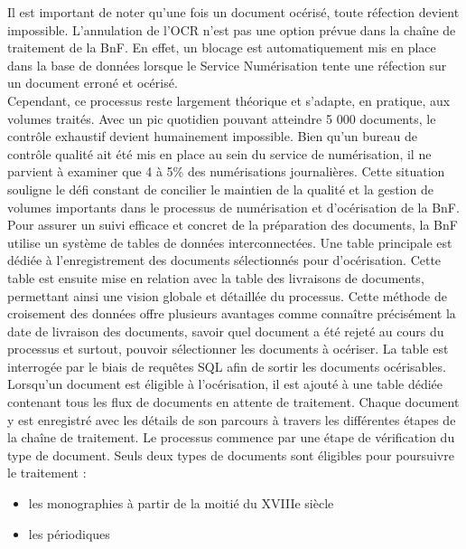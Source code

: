 \documentclass[a4paper,12pt,twoside]{book}
\begin{document}
	Il est important de noter qu'une fois un document océrisé, toute réfection devient impossible. L'annulation de l'OCR n'est pas une option prévue dans la chaîne de traitement de la BnF. En effet, un blocage est automatiquement mis en place dans la base de données lorsque le Service Numérisation tente une réfection sur un document erroné et océrisé.
	\\
	
	Cependant, ce processus reste largement théorique et s'adapte, en pratique, aux volumes traités. Avec un pic quotidien pouvant atteindre 5 000 documents, le contrôle exhaustif devient humainement impossible. Bien qu'un bureau de contrôle qualité ait été mis en place au sein du service de numérisation, il ne parvient à examiner que 4 à 5\% des numérisations journalières. Cette situation souligne le défi constant de concilier le maintien de la qualité et la gestion de volumes importants dans le processus de numérisation et d’océrisation de la BnF.
	\\
	
	Pour assurer un suivi efficace et concret de la préparation des documents, la BnF utilise un système de tables de données interconnectées. Une table principale est dédiée à l'enregistrement des documents sélectionnés pour d’océrisation. Cette table est ensuite mise en relation avec la table des livraisons de documents, permettant ainsi une vision globale et détaillée du processus. Cette méthode de croisement des données offre plusieurs avantages comme connaître précisément la date de livraison des documents, savoir quel document a été rejeté au cours du processus et surtout, pouvoir sélectionner les documents à océriser. La table est interrogée par le biais de requêtes SQL afin de sortir les documents océrisables.
	\\
	
	Lorsqu’un document est éligible à l'océrisation, il est ajouté à une table dédiée contenant tous les flux de documents en attente de traitement. Chaque document y est enregistré avec les détails de son parcours à travers les différentes étapes de la chaîne de traitement. Le processus commence par une étape de vérification du type de document. Seuls deux types de documents sont éligibles pour poursuivre le traitement : 
	\begin{itemize}
		\item les monographies à partir de la moitié du XVIIIe siècle
		\item les périodiques
	\end{itemize}
	
\end{document}
